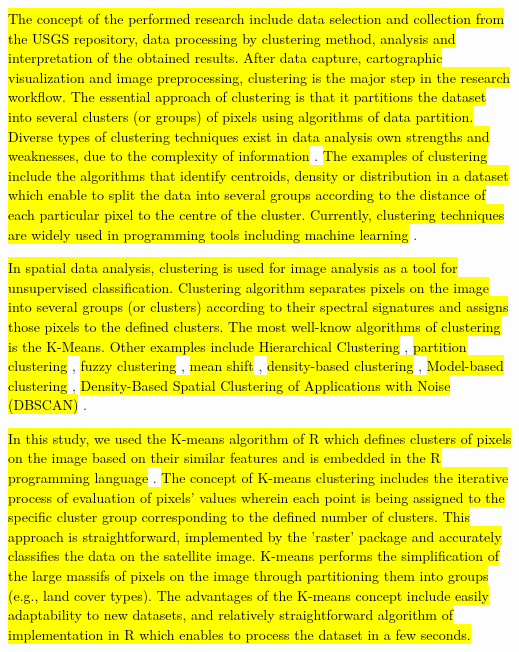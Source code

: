 \documentclass[information,article,submit,pdftex,moreauthors]{Definitions/mdpi}
\begin{document}
\hl{The concept of the performed research include data selection and collection from the USGS repository, data processing by clustering method, analysis and interpretation of the obtained results. After data capture, cartographic visualization and image preprocessing, clustering is the major step in the research workflow. The essential approach of clustering is that it partitions the dataset into several clusters (or groups) of pixels using algorithms of data partition. Diverse types of clustering techniques exist in data analysis own strengths and weaknesses, due to the complexity of information} \cite{XuTian}. \hl{The examples of clustering include the algorithms that identify centroids, density or distribution in a dataset which enable to split the data into several groups according to the distance of each particular pixel to the centre of the cluster. Currently, clustering techniques are widely used in programming tools including machine learning} \cite{CHANDER2023179}.

\hl{In spatial data analysis, clustering is used for image analysis as a tool for unsupervised classification. Clustering algorithm separates pixels on the image into several groups (or clusters) according to their spectral signatures and assigns those pixels to the defined clusters. The most well-know algorithms of clustering is the K-Means. Other examples include Hierarchical Clustering} \cite{ZHIYING2023101935,XIE2023109230}, \hl{partition clustering} \cite{ZEIN2023100731}, \hl{fuzzy clustering} \cite{ROY2012452}, \hl{mean shift} \cite{GUO201828,BECK2019128}, \hl{density-based clustering} \cite{CHENG2023170,MAHESHWARI2023109341}, \hl{Model-based clustering} \cite{YOU2022107457}, \hl{Density-Based Spatial Clustering of Applications with Noise (DBSCAN)} \cite{OUYANG2022688,PRANATA2023319,WU202257}. 

\hl{In this study, we used the K-means algorithm of R which defines clusters of pixels on the image based on their similar features and is embedded in the R programming language} \cite{FAVERO2023193}. \hl{The concept of K-means clustering includes the iterative process of evaluation of pixels' values wherein each point is being assigned to the specific cluster group corresponding to the defined number of clusters. This approach is straightforward, implemented by the 'raster' package and accurately classifies the data on the satellite image. K-means performs the simplification of the large massifs of pixels on the image through partitioning them into groups (e.g., land cover types). The advantages of the K-means concept include easily adaptability to new datasets, and relatively straightforward algorithm of implementation in R which enables to process the dataset in a few seconds.}
\end{document}
